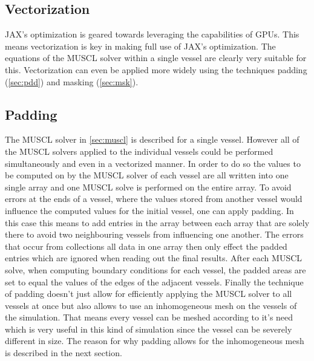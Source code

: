 \documentclass[a4paper, oneside]{discothesis}
\begin{document}
\subsection{Vectorization} \label{sec:vect}
JAX's optimization is geared towards leveraging the capabilities of GPUs.
This means vectorization is key in making full use of JAX's optimization.
The equations of the MUSCL solver within a single vessel are clearly very suitable for this.
Vectorization can even be applied more widely using the techniques padding (\autoref{sec:pdd}) and masking (\autoref{sec:msk}).

\subsection{Padding} \label{sec:pdd}
The MUSCL solver in \autoref{sec:muscl} is described for a single vessel.
However all of the MUSCL solvers applied to the individual vessels could be performed simultaneously and even in a vectorized manner.
In order to do so the values to be computed on by the MUSCL solver of each vessel are all written into one single array and one MUSCL solve is performed on the entire array.
To avoid errors at the ends of a vessel, where the values stored from another vessel would influence the computed values for the initial vessel, one can apply padding.
In this case this means to add entries in the array between each array that are solely there to avoid two neighbouring vessels from influencing one another.
The errors that occur from collections all data in one array then only effect the padded entries which are ignored when reading out the final results.
After each MUSCL solve, when computing boundary conditions for each vessel, the padded areas are set to equal the values of the edges of the adjacent vessels.
Finally the technique of padding doesn't just allow for efficiently applying the MUSCL solver to all vessels at once but also allows to use an inhomogeneous mesh on the vessels of the simulation.
That means every vessel can be meshed according to it's need which is very useful in this kind of simulation since the vessel can be severely different in size.
The reason for why padding allows for the inhomogeneous mesh is described in the next section.
\end{document}
